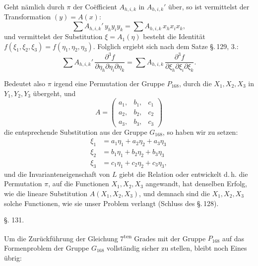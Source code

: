 
Geht nämlich durch $\pi$ der Coëfficient $A_{h,i,k}$ in $A_{h,i,k}'$ über, so ist vermittelst der Transformation $(y) = A(x)$:
\[
\sum A_{h,i,k}' \, y_h y_i y_k = \sum A_{h,i,k} \, x_h x_i x_k,
\]
und vermittelst der Substitution $\xi = A_1(\eta)$ besteht die Identität $f(\xi_1, \xi_2, \xi_3) = f(\eta_1, \eta_2, \eta_3)$. Folglich ergiebt sich nach dem Satze \S.\,129, 3.:
\[
\sum A_{h,i,k}' \, \frac{\partial^3 f}{\partial\eta_h\partial\eta_i\partial\eta_k} = \sum A_{h,i,k} \, \frac{\partial^3 f}{\partial\xi_h\partial\xi_i\partial\xi_k}.
\]

Bedeutet also $\pi$ irgend eine Permutation der Gruppe $P_{168}$, durch die $X_1, X_2, X_3$ in $Y_1, Y_2, Y_3$ übergeht, und
\[
A = \begin{pmatrix} a_1, & b_1, & c_1\\ a_2, & b_2, & c_2\\ a_3, & b_3, & c_3 \end{pmatrix}
\]
die entsprechende Substitution aus der Gruppe $G_{168}$, so haben wir zu setzen:
\[
\begin{aligned}
\xi_1 &= a_1\eta_1 + a_2\eta_2 + a_3\eta_3\\
\xi_2 &= b_1\eta_1 + b_2\eta_2 + b_3\eta_3\\
\xi_3 &= c_1\eta_1 + c_2\eta_2 + c_3\eta_3,
\end{aligned}
\]
und die Invarianteneigenschaft von $L$ giebt die Relation
oder entwickelt
d.\,h. die Permutation $\pi$, auf die Functionen $X_1, X_2, X_3$ angewandt, hat denselben Erfolg, wie die lineare Substitution $A(X_1, X_2, X_3)$, und demnach sind die $X_1, X_2, X_3$ solche Functionen, wie sie unser Problem verlangt (Schluss des \S.\,128).

\begin{center}
\S. 131.

\end{center}

Um die Zurückführung der Gleichung 7\textsuperscript{ten} Grades mit der Gruppe $P_{168}$ auf das Formenproblem der Gruppe $G_{168}$ vollständig sicher zu stellen, bleibt noch Eines übrig:
